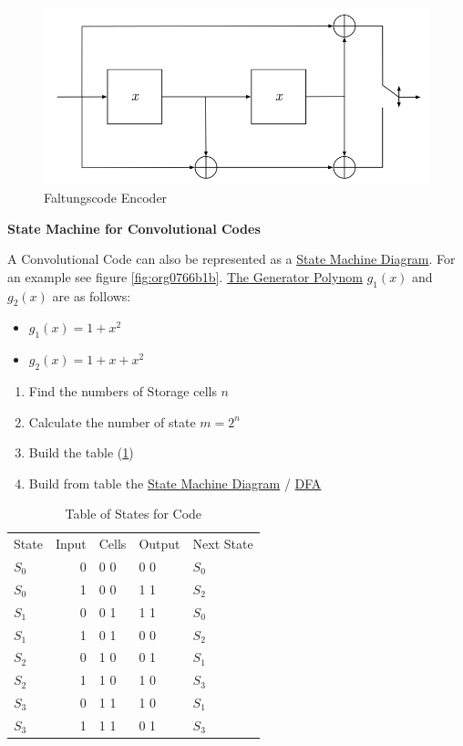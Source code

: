 \documentclass[11pt,twoside,twocolumn,landscape]{article}
\begin{document}
\begin{figure}[htbp]
\centering
\includegraphics[width=.9\linewidth]{img/encoders_faltungscodes.png}
\caption{\label{fig:org89ff4c4}Faltungscode Encoder}
\end{figure}


\textbf{State Machine for Convolutional Codes}

A Convolutional Code can also be represented as a \href{../../../roam/20211108155646-state_machine_diagram.org}{State Machine Diagram}.
For an example see figure \ref{fig:org0766b1b}.
\href{../../../roam/20211105145648-the_generator_polynom_for_hamming_codes.org}{The Generator Polynom} \(g_1(x)\) and \(g_2(x)\) are as follows:

\begin{itemize}
\item \(g_1(x) = 1 + x^2\)
\item \(g_2(x) = 1 + x + x^2\)
\end{itemize}


\begin{enumerate}
\item Find the numbers of Storage cells \(n\)
\item Calculate the number of state \(m = 2^n\)
\item Build the table (\ref{tab:org5c9f7f2})
\item Build from table the \href{../../../roam/20211108155646-state_machine_diagram.org}{State Machine Diagram} / \href{../../../roam/20211109182310-deterministic_finite_automaton.org}{DFA}
\end{enumerate}


\begin{table}[htbp]
\caption{\label{tab:org5c9f7f2}Table of States for Code}
\centering
\begin{tabular}{lrlll}
State & Input & Cells & Output & Next State\\
\(S_0\) & 0 & 0 0 & 0 0 & \(S_0\)\\
\(S_0\) & 1 & 0 0 & 1 1 & \(S_2\)\\
\(S_1\) & 0 & 0 1 & 1 1 & \(S_0\)\\
\(S_1\) & 1 & 0 1 & 0 0 & \(S_2\)\\
\(S_2\) & 0 & 1 0 & 0 1 & \(S_1\)\\
\(S_2\) & 1 & 1 0 & 1 0 & \(S_3\)\\
\(S_3\) & 0 & 1 1 & 1 0 & \(S_1\)\\
\(S_3\) & 1 & 1 1 & 0 1 & \(S_3\)\\
\end{tabular}
\end{table}
\end{document}
